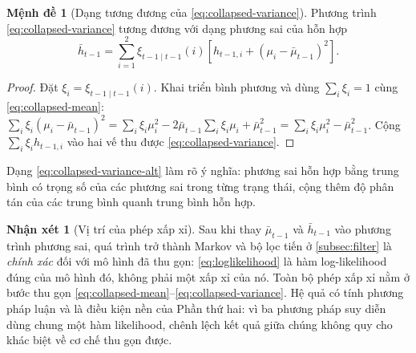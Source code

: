 \documentclass[12pt,a4paper]{article}
\numberwithin{equation}{section}
\theoremstyle{definition}
\newtheorem{proposition}{Mệnh đề}[section]
\newtheorem{remark}{Nhận xét}[section]
\begin{document}
\begin{proposition}[Dạng tương đương của \eqref{eq:collapsed-variance}]\label{prop:gray}
Phương trình \eqref{eq:collapsed-variance} tương đương với dạng phương sai của hỗn hợp
\begin{equation}
  \bar h_{t-1}=\sum_{i=1}^{2}\xi_{t-1\mid t-1}(i)
  \left[h_{t-1,i}+\left(\mu_i-\bar\mu_{t-1}\right)^{2}\right].
  \label{eq:collapsed-variance-alt}
\end{equation}
\end{proposition}
\begin{proof}
Đặt $\xi_i=\xi_{t-1\mid t-1}(i)$. Khai triển bình phương và dùng $\sum_i\xi_i=1$ cùng
\eqref{eq:collapsed-mean}:
$\sum_i\xi_i(\mu_i-\bar\mu_{t-1})^{2}
=\sum_i\xi_i\mu_i^{2}-2\bar\mu_{t-1}\sum_i\xi_i\mu_i+\bar\mu_{t-1}^{2}
=\sum_i\xi_i\mu_i^{2}-\bar\mu_{t-1}^{2}$.
Cộng $\sum_i\xi_i h_{t-1,i}$ vào hai vế thu được \eqref{eq:collapsed-variance}.
\end{proof}

Dạng \eqref{eq:collapsed-variance-alt} làm rõ ý nghĩa: phương sai hỗn hợp bằng trung bình
có trọng số của các phương sai trong từng trạng thái, cộng thêm độ phân tán của các trung
bình quanh trung bình hỗn hợp.

\begin{remark}[Vị trí của phép xấp xỉ]\label{rem:approx-location}
Sau khi thay $\bar\mu_{t-1}$ và $\bar h_{t-1}$ vào phương trình phương sai, quá trình trở
thành Markov và bộ lọc tiến ở \cref{subsec:filter} là \emph{chính xác} đối với mô hình đã
thu gọn: \eqref{eq:loglikelihood} là hàm log-likelihood đúng của mô hình đó, không phải
một xấp xỉ của nó. Toàn bộ phép xấp xỉ nằm ở bước thu gọn
\eqref{eq:collapsed-mean}--\eqref{eq:collapsed-variance}. Hệ quả có tính phương pháp luận
và là điều kiện nền của Phần thứ hai: vì ba phương pháp suy diễn dùng chung một hàm
likelihood, chênh lệch kết quả giữa chúng không quy cho khác biệt về cơ chế thu gọn được.
\end{remark}
\end{document}
